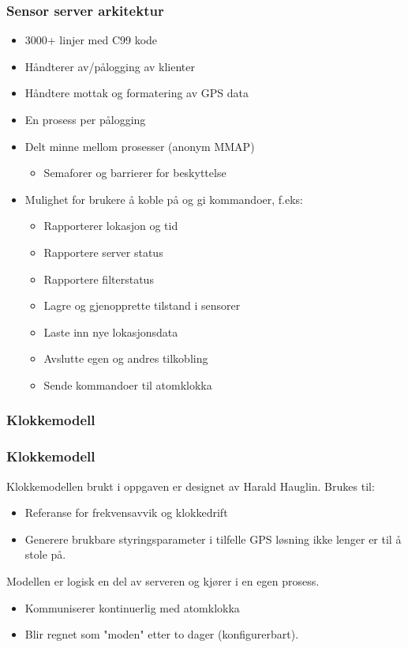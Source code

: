 \documentclass[xcolor=table]{beamer}
\begin{document}
\begin{frame}
  \frametitle{Sensor server arkitektur}
  \begin{itemize}
    \item 3000+ linjer med C99 kode
    \item Håndterer av/pålogging av klienter
    \item Håndtere mottak og formatering av GPS data
    \item En prosess per pålogging
    \item Delt minne mellom prosesser (anonym MMAP)
      \begin{itemize}
        \item Semaforer og barrierer for beskyttelse
      \end{itemize}
    \item Mulighet for brukere å koble på og gi kommandoer, f.eks:
      \begin{itemize}
        \item Rapporterer lokasjon og tid
        \item Rapportere server status
        \item Rapportere filterstatus
        \item Lagre og gjenopprette tilstand i sensorer
        \item Laste inn nye lokasjonsdata
        \item Avslutte egen og andres tilkobling
        \item Sende kommandoer til atomklokka 
      \end{itemize}
  \end{itemize}
\end{frame}

\subsubsection{Klokkemodell}
\begin{frame}
  \frametitle{Klokkemodell}
    Klokkemodellen brukt i oppgaven er designet av Harald Hauglin. Brukes til:
    \begin{itemize}
      \item Referanse for frekvensavvik og klokkedrift 
      \item Generere brukbare styringsparameter i tilfelle GPS løsning ikke lenger er til å stole på.
    \end{itemize}
    Modellen er logisk en del av serveren og kjører i en egen prosess.
    \begin{itemize}
      \item Kommuniserer kontinuerlig med atomklokka
      \item Blir regnet som "moden" etter to dager (konfigurerbart).
    \end{itemize}
\end{frame}
\end{document}
